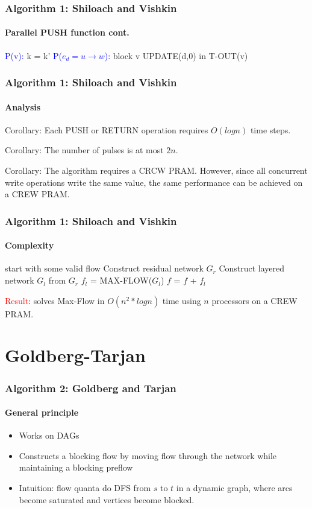 \documentclass{beamer}
\begin{document}
\begin{frame}
\frametitle{Algorithm 1: Shiloach and Vishkin}
\framesubtitle{Parallel PUSH function cont.} 
\begin{algorithmic}[1]
	\State \textcolor{blue}{P(v):} k = k'
	\State \textcolor{blue}{P($e_d = u \rightarrow w$):}
		\State block v
		\State UPDATE(d,0) in T-OUT(v)
	\EndIf
\end{algorithmic}
\end{frame}

\begin{frame}
\frametitle{Algorithm 1: Shiloach and Vishkin}
\framesubtitle{Analysis} 
\begin{block}{Corollary:}
Each PUSH or RETURN operation requires $O(log n)$ time steps.
\end{block}
\pause
\begin{block}{Corollary:}
The number of pulses is at most $2n$.
\end{block}
\begin{block}{Corollary:}
The algorithm requires a CRCW PRAM. However, since all concurrent write operations write the same value, the same performance can be achieved on a CREW PRAM.
\end{block}

\end{frame}

\begin{frame}
\frametitle{Algorithm 1: Shiloach and Vishkin}
\framesubtitle{Complexity} 
	\begin{algorithmic}[1]
	\State start with some valid flow 
	 \Comment{\textcolor{OliveGreen}{$O(n)$}}	
		\State Construct residual network $G_r$ \Comment{\textcolor{OliveGreen}{$O(n)$, $p=On)$}}
		\State Construct layered network $G_l$ from $G_r$ 
		\State $f_l$ = MAX-FLOW($G_l$)  \Comment{\textcolor{OliveGreen}{$O(n * log n)$}}
		\State $f$ = $f$ + $f_l$ \Comment{\textcolor{OliveGreen}{$O(n)$}}
	\EndWhile
	\EndFunction
	\end{algorithmic}
	
\pause
\textcolor{red}{Result}: solves Max-Flow in $O({n}^{2} * log n)$ time using $n$ processors on a CREW PRAM.
\end{frame}

\section{Goldberg-Tarjan}
\begin{frame}
\frametitle{Algorithm 2: Goldberg and Tarjan}
\framesubtitle{General principle}
\begin{itemize}
	\item Works on DAGs
	\item Constructs a blocking flow by moving flow through the network while maintaining a blocking preflow	
	\item Intuition: flow quanta do DFS from $s$ to $t$ in a dynamic graph, where arcs become saturated and vertices become blocked.
\end{itemize} 
\end{frame}
\end{document}

